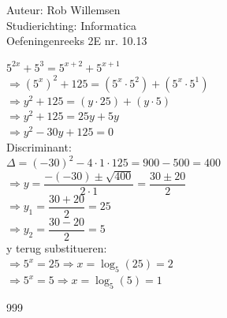 \documentclass[a4paper]{article}
\begin{document}
\noindent \large Auteur: Rob Willemsen \\
\noindent \large Studierichting: Informatica\\
\noindent \large Oefeningenreeks 2E nr. 10.13\\

\medskip

\normalsize

$5^{2x} + 5^3 = 5^{x + 2} + 5^{x+1}$\\

$\Rightarrow (5^x)^2 + 125 = (5^x \cdot 5^2) + (5^x \cdot 5^1)$\\

$\Rightarrow y^2 + 125 = (y \cdot 25) + (y \cdot 5)$\\

$\Rightarrow y^2 + 125 = 25y + 5y$\\

$\Rightarrow y^2 - 30y + 125 = 0$\\

Discriminant: \\

$\Delta = (-30)^2 - 4 \cdot 1 \cdot 125 = 900 - 500 = 400$\\

$\Rightarrow y = \dfrac{-(-30) \pm \sqrt{400}}{2 \cdot 1} = \dfrac{30 \pm 20}{2}$\\

$\Rightarrow y_1 = \dfrac{30 + 20}{2} = 25$\\

$\Rightarrow y_2 = \dfrac{30 - 20}{2} = 5$\\

y terug substitueren: \\

$\Rightarrow 5^x = 25 \Rightarrow x = \log_5(25) = 2$\\

$\Rightarrow 5^x = 5 \Rightarrow x = \log_5(5) = 1$\\

\begin{thebibliography}{999}
\end{thebibliography}
\end{document}
